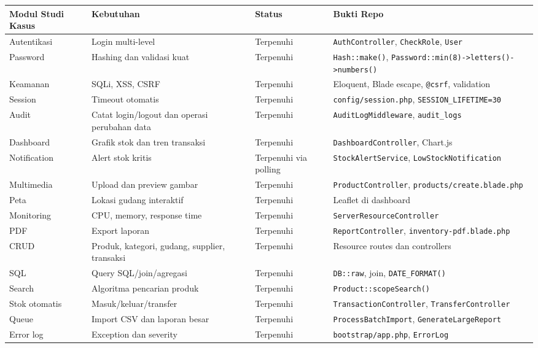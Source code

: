 \documentclass[
]{article}
\begin{document}
\begin{longtable}[]{@{}P{0.15\textwidth}P{0.22\textwidth}P{0.18\textwidth}P{0.39\textwidth}@{}}
\toprule\noalign{}
Modul Studi Kasus & Kebutuhan & Status & Bukti Repo \\
\midrule\noalign{}
\endhead
\bottomrule\noalign{}
\endlastfoot
Autentikasi & Login multi-level & Terpenuhi & \texttt{AuthController},
\texttt{CheckRole}, \texttt{User} \\
Password & Hashing dan validasi kuat & Terpenuhi &
\texttt{Hash::make()},
\texttt{Password::min(8)-\textgreater{}\allowbreak letters()-\textgreater{}\allowbreak numbers()} \\
Keamanan & SQLi, XSS, CSRF & Terpenuhi & Eloquent, Blade escape,
\texttt{@csrf}, validation \\
Session & Timeout otomatis & Terpenuhi & \texttt{config/session.php},
\texttt{SESSION\_LIFETIME=30} \\
Audit & Catat login/logout dan operasi perubahan data & Terpenuhi &
\texttt{AuditLogMiddleware}, \texttt{audit\_logs} \\
Dashboard & Grafik stok dan tren transaksi & Terpenuhi &
\texttt{DashboardController}, Chart.js \\
Notification & Alert stok kritis & Terpenuhi via polling &
\texttt{StockAlertService}, \texttt{LowStockNotification} \\
Multimedia & Upload dan preview gambar & Terpenuhi &
\texttt{ProductController}, \texttt{products/create.blade.php} \\
Peta & Lokasi gudang interaktif & Terpenuhi & Leaflet di dashboard \\
Monitoring & CPU, memory, response time & Terpenuhi &
\texttt{ServerResourceController} \\
PDF & Export laporan & Terpenuhi & \texttt{ReportController},
\texttt{inventory-pdf.blade.php} \\
CRUD & Produk, kategori, gudang, supplier, transaksi & Terpenuhi &
Resource routes dan controllers \\
SQL & Query SQL/join/agregasi & Terpenuhi & \texttt{DB::raw}, join,
\texttt{DATE\_FORMAT()} \\
Search & Algoritma pencarian produk & Terpenuhi &
\texttt{Product::scopeSearch()} \\
Stok otomatis & Masuk/keluar/transfer & Terpenuhi &
\texttt{TransactionController}, \texttt{TransferController} \\
Queue & Import CSV dan laporan besar & Terpenuhi &
\texttt{ProcessBatchImport}, \texttt{GenerateLargeReport} \\
Error log & Exception dan severity & Terpenuhi &
\texttt{bootstrap/app.php}, \texttt{ErrorLog} \\
\end{longtable}
\end{document}
